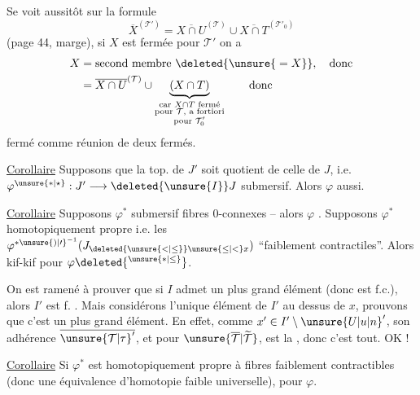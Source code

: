 Se voit aussitôt sur la formule
\[
\overline{X}^{(\mathcal{T}')}=\overline{X\cap U}^{(\mathcal{T})}\cup\overline{X\cap T}^{(\mathcal{T}'_0)}
\]
(page 44, marge), si $X$ est fermée pour $\mathcal{T}'$ on a
\[
\begin{aligned}
X&=\text{second membre}\ \deleted{\unsure{{}=X}},\quad\text{donc}\\
&=\overline{X\cap U}^{(\mathcal{T})}\cup
\underbrace{(X\cap T)}_{\substack{\text{car }X\cap T\text{ fermé}\\\text{pour }\mathcal{T},\text{ a fortiori}\\\text{pour }\mathcal{T}'_0}}
\qquad\text{donc}
\end{aligned}
\]
 fermé comme réunion de deux fermés.

\uline{Corollaire}  Supposons que la top. de $J'$ soit quotient de celle de $J$,  i.e. $\varphi^{\unsure{*|\star}}:J'\longrightarrow \deleted{\unsure{I}}J$ submersif. Alors $\varphi$ aussi.

\uline{Corollaire}  Supposons $\varphi^*$ submersif  fibres $0$-connexes -- alors $\varphi$ . Supposons $\varphi^*$  homotopiquement propre i.e. les $\varphi^{{*\unsure{)|\prime}}^{-1}}(J_{\deleted{\unsure{<|\leq}}\unsure{\leq|<}x})$ ``faiblement contractiles''.  Alors kif-kif pour $\varphi\deleted{^{\unsure{*|\leq}}}$.

On est ramené à prouver que si $I$ admet un plus grand élément  (donc est f.c.), alors $I'$ est f. . Mais considérons l'unique élément  de $I'$ au dessus de $x$, prouvons que c'est un plus grand élément. En effet, comme $x'\in I'\setminus{\unsure{U|u|n}}'$, son adhérence  $\overline{{\unsure{\mathcal{T}|\tau}}'}$, et pour $\unsure{\overline{\mathcal{T}}|\widetilde{\mathcal{T}}}$, est la \unsure{$=$}, donc c'est tout. OK !

\uline{Corollaire}  Si $\varphi^*$ est homotopiquement propre à fibres  faiblement contractibles (donc une équivalence d'homotopie faible universelle),  pour $\varphi$.

